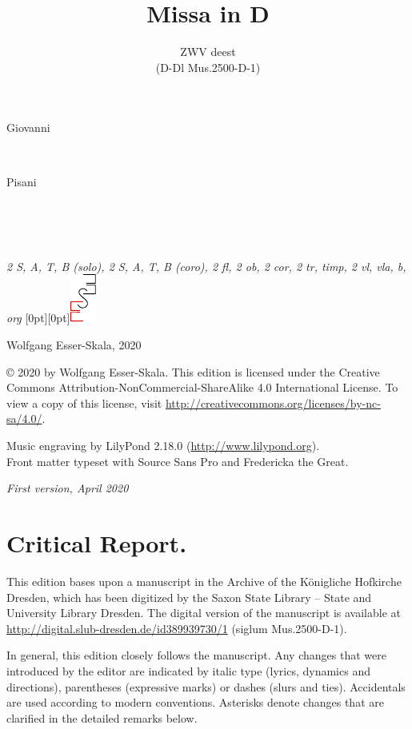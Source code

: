\documentclass[parskip=full]{scrreprt}
\makeatletter
\DeclareRobustCommand{\sbseries}{\fontseries{sb}\selectfont}
\newcommand\fancytitlehead{
	\headingfont%
	\fontsize{80}{80}\selectfont\textcolor{black!80}{\@lastname.}\\[15pt]%
	\fontsize{60}{60}\selectfont\@title.%
}
\def\firstname#1{\def\@firstname{#1}}
\def\lastname#1{\def\@lastname{#1}}
\def\instrumentation#1{\def\@instrumentation{#1}}
\def\maketitle{%
\begin{titlepage}%
	\Large%
	{\@titlehead}%
	\vfill%
	{\strut\@firstname}\\%
	{\sbseries\color{oldred}\strut\@lastname}\\%
	{\strut\@namesuffix}%
	\vfill%
	{\sbseries\@title}\\%
	{\@subtitle}\\[\baselineskip]%
	{\itshape\@instrumentation}%
	\vfill%
	{\itshape\@parts}\hspace*{\fill}\raisebox{0pt}[0pt][0pt]{\includegraphics{ees_logo}}%
\end{titlepage}%
}
\newif\ifprintreport\printreportfalse
\makeatother
\begin{document}
\titlehead{\fancytitlehead}
\firstname{Giovanni} %
\lastname{Pisani}
\title{Missa in D}
\subtitle{ZWV deest\\(D-Dl Mus.2500-D-1)}
\instrumentation{2 S, A, T, B (solo), 2 S, A, T, B (coro), 2 fl, 2 ob, 2 cor, 2 tr, timp, 2 vl, vla, b, org}
\maketitle


\thispagestyle{empty}

\vspace*{\fill}

\hspace*{1em}Wolfgang Esser-Skala, 2020

© 2020 by Wolfgang Esser-Skala. This edition is licensed under the Creative Commons Attribution-NonCommercial-ShareAlike 4.0 International License. To view a copy of this license, visit \url{http://creativecommons.org/licenses/by-nc-sa/4.0/}. 

Music engraving by LilyPond 2.18.0 (\url{http://www.lilypond.org}).\\
Front matter typeset with Source Sans Pro and Fredericka the Great.

\textit{First version, April 2020}

\vspace*{2cm}

\ifprintreport
\chapter*{Critical Report.}

This edition bases upon a manuscript in the Archive of the Königliche Hofkirche Dresden, which has been digitized by the Saxon State Library – State and University Library Dresden. The digital version of the manuscript is available at \url{http://digital.slub-dresden.de/id389939730/1} (siglum Mus.2500-D-1).

In general, this edition closely follows the manuscript. Any changes that were introduced by the editor are indicated by italic type (lyrics, dynamics and directions), parentheses (expressive marks) or dashes (slurs and ties). Accidentals are used according to modern conventions. Asterisks denote changes that are clarified in the detailed remarks below.
\end{document}
